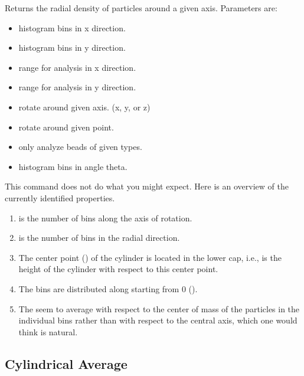 Returns the radial density of particles around a given
axis. Parameters are:
\begin{itemize}
\item {} histogram bins in x direction.
\item {} histogram bins in y direction.
\item {} range for analysis in x direction.
\item {} range for analysis in y direction.
\item {} rotate around given axis. (x, y, or z)
\item {} rotate around given point.
\item {} only analyze beads of given types.
\item {} histogram bins in angle theta.
\end{itemize}


This command does not do what you might expect.  Here is an overview
of the currently identified properties.
\begin{enumerate}
\item {} is the number of bins along the axis of rotation.
\item {} is the number of bins in the radial direction.
\item The center point () of the cylinder is
  located in the lower cap, i.e.,  is the height of the
  cylinder with respect to this center point.
\item The bins are distributed along  starting
  from 0 ().
\item The  seem to average with respect to the center
  of mass of the particles in the individual bins rather than with
  respect to the central axis, which one would think is natural.
\end{enumerate}

\subsection{Cylindrical Average}
\label{analyze:cylindricalaverage}

\begin{pysyntax}
\end{pysyntax}

